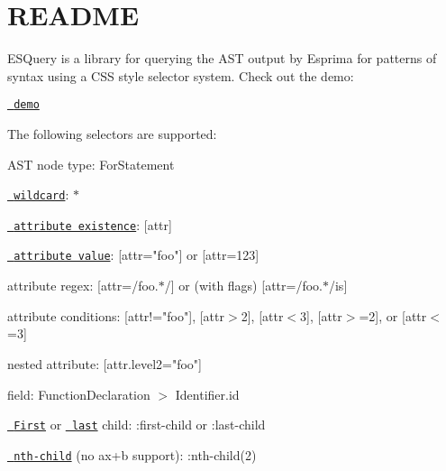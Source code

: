 \chapter{README}
\hypertarget{md_pkiclassroomrescheduler_2src_2main_2frontend_2node__modules_2esquery_2_r_e_a_d_m_e}{}\label{md_pkiclassroomrescheduler_2src_2main_2frontend_2node__modules_2esquery_2_r_e_a_d_m_e}
ESQuery is a library for querying the AST output by Esprima for patterns of syntax using a CSS style selector system. Check out the demo\+:

\href{https://estools.github.io/esquery/}{\texttt{ demo}}

The following selectors are supported\+:
\begin{DoxyItemize}
\item AST node type\+: {\ttfamily For\+Statement}
\item \href{http://dev.w3.org/csswg/selectors4/\#universal-selector}{\texttt{ wildcard}}\+: {\ttfamily \texorpdfstring{$\ast$}{*}}
\item \href{http://dev.w3.org/csswg/selectors4/\#attribute-selectors}{\texttt{ attribute existence}}\+: {\ttfamily \mbox{[}attr\mbox{]}}
\item \href{http://dev.w3.org/csswg/selectors4/\#attribute-selectors}{\texttt{ attribute value}}\+: {\ttfamily \mbox{[}attr="{}foo"{}\mbox{]}} or {\ttfamily \mbox{[}attr=123\mbox{]}}
\item attribute regex\+: {\ttfamily \mbox{[}attr=/foo.\texorpdfstring{$\ast$}{*}/\mbox{]}} or (with flags) {\ttfamily \mbox{[}attr=/foo.\texorpdfstring{$\ast$}{*}/is\mbox{]}}
\item attribute conditions\+: {\ttfamily \mbox{[}attr!="{}foo"{}\mbox{]}}, {\ttfamily \mbox{[}attr\texorpdfstring{$>$}{>}2\mbox{]}}, {\ttfamily \mbox{[}attr\texorpdfstring{$<$}{<}3\mbox{]}}, {\ttfamily \mbox{[}attr\texorpdfstring{$>$}{>}=2\mbox{]}}, or {\ttfamily \mbox{[}attr\texorpdfstring{$<$}{<}=3\mbox{]}}
\item nested attribute\+: {\ttfamily \mbox{[}attr.\+level2="{}foo"{}\mbox{]}}
\item field\+: {\ttfamily Function\+Declaration \texorpdfstring{$>$}{>} Identifier.\+id}
\item \href{http://dev.w3.org/csswg/selectors4/\#the-first-child-pseudo}{\texttt{ First}} or \href{http://dev.w3.org/csswg/selectors4/\#the-last-child-pseudo}{\texttt{ last}} child\+: {\ttfamily \+:first-\/child} or {\ttfamily \+:last-\/child}
\item \href{http://dev.w3.org/csswg/selectors4/\#the-nth-child-pseudo}{\texttt{ nth-\/child}} (no ax+b support)\+: {\ttfamily \+:nth-\/child(2)}

\end{DoxyItemize}

